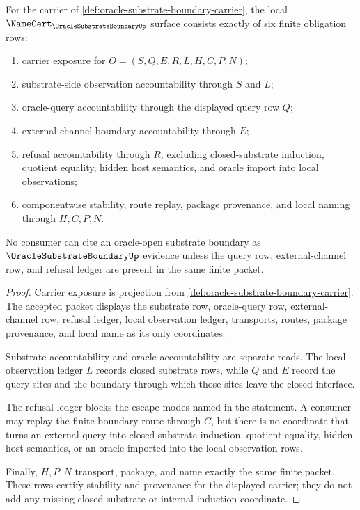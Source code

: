 \begin{theorem}
\label{thm:oracle-substrate-boundary-namecert-obligations}
For the carrier of \autoref{def:oracle-substrate-boundary-carrier}, the local $\NameCert_{\OracleSubstrateBoundaryUp}$ surface consists exactly of six finite obligation rows:
\begin{enumerate}
\item carrier exposure for $O=(S,Q,E,R,L,H,C,P,N)$;
\item substrate-side observation accountability through $S$ and $L$;
\item oracle-query accountability through the displayed query row $Q$;
\item external-channel boundary accountability through $E$;
\item refusal accountability through $R$, excluding closed-substrate induction, quotient equality, hidden host semantics, and oracle import into local observations;
\item componentwise stability, route replay, package provenance, and local naming through $H,C,P,N$.
\end{enumerate}
No consumer can cite an oracle-open substrate boundary as $\OracleSubstrateBoundaryUp$ evidence unless the query row, external-channel row, and refusal ledger are present in the same finite packet.
\end{theorem}
\begin{proof}
Carrier exposure is projection from \autoref{def:oracle-substrate-boundary-carrier}. The accepted packet displays the substrate row, oracle-query row, external-channel row, refusal ledger, local observation ledger, transports, routes, package provenance, and local name as its only coordinates.

Substrate accountability and oracle accountability are separate reads. The local observation ledger $L$ records closed substrate rows, while $Q$ and $E$ record the query sites and the boundary through which those sites leave the closed interface.

The refusal ledger blocks the escape modes named in the statement. A consumer may replay the finite boundary route through $C$, but there is no coordinate that turns an external query into closed-substrate induction, quotient equality, hidden host semantics, or an oracle imported into the local observation rows.

Finally, $H,P,N$ transport, package, and name exactly the same finite packet. These rows certify stability and provenance for the displayed carrier; they do not add any missing closed-substrate or internal-induction coordinate.
\end{proof}

